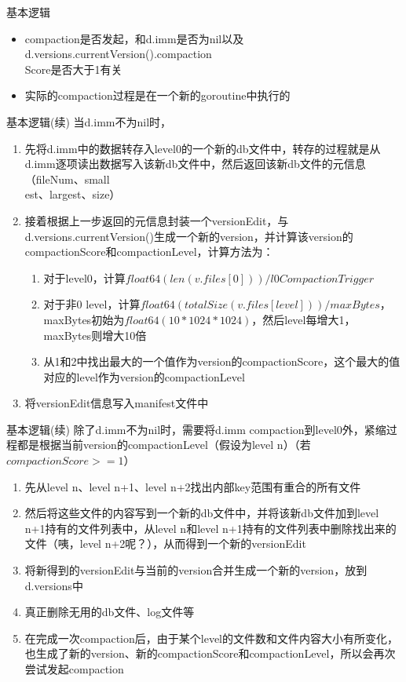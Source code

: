 \documentclass[CJK, 8pt]{beamer}
\begin{document}
\begin{CJK*}{UTF8}{gkai}
\begin{frame}{基本逻辑}
\begin{block}{}
\begin{itemize}
\item compaction是否发起，和d.imm是否为nil以及d.versions.currentVersion().compaction\\Score是否大于1有关
\item 实际的compaction过程是在一个新的goroutine中执行的
\end{itemize}
\end{block}
\end{frame}
\begin{frame}{基本逻辑(续)}
当d.imm不为nil时，
\begin{enumerate}
\item 先将d.imm中的数据转存入level0的一个新的db文件中，转存的过程就是从d.imm逐项读出数据写入该新db文件中，然后返回该新db文件的元信息（fileNum、small\\est、largest、size）
\item 接着根据上一步返回的元信息封装一个versionEdit，与d.versions.currentVersion()生成一个新的version，并计算该version的compactionScore和compactionLevel，计算方法为：
	\begin{enumerate}
	\item 对于level0，计算$float64(len(v.files[0])) / l0CompactionTrigger$
	\item 对于非0 level，计算$float64(totalSize(v.files[level])) / maxBytes$，maxBytes初始为$float64(10 * 1024 * 1024)$，然后level每增大1，maxBytes则增大10倍
	\item 从1和2中找出最大的一个值作为version的compactionScore，这个最大的值对应的level作为version的compactionLevel
	\end{enumerate}
\item 将versionEdit信息写入manifest文件中
\end{enumerate}
\end{frame}
\begin{frame}{基本逻辑(续)}
除了d.imm不为nil时，需要将d.imm compaction到level0外，紧缩过程都是根据当前version的compactionLevel（假设为level n）（若$compactionScore >= 1$）
\begin{enumerate}
\item 先从level n、level n+1、level n+2找出内部key范围有重合的所有文件
\item 然后将这些文件的内容写到一个新的db文件中，并将该新db文件加到level n+1持有的文件列表中，从level n和level n+1持有的文件列表中删除找出来的文件（咦，level n+2呢？），从而得到一个新的versionEdit
\item 将新得到的versionEdit与当前的version合并生成一个新的version，放到d.versions中
\item 真正删除无用的db文件、log文件等
\item 在完成一次compaction后，由于某个level的文件数和文件内容大小有所变化，也生成了新的version、新的compactionScore和compactionLevel，所以会再次尝试发起compaction
\end{enumerate}
\end{frame}

\end{CJK*}
\end{document}
